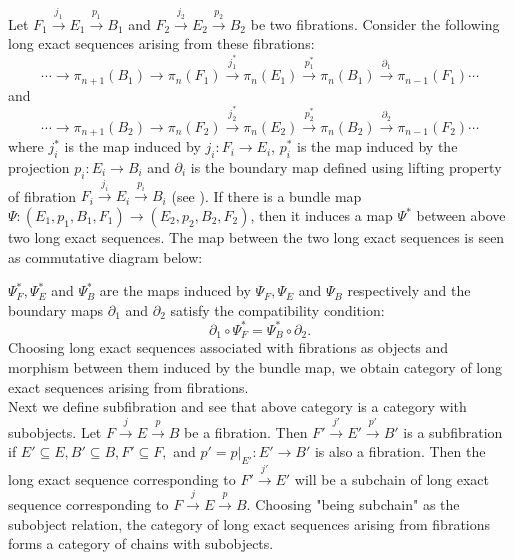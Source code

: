 \documentclass{amsart}
\theoremstyle{plain}
\begin{document}
Let $F_1\stackrel{j_1}{\rightarrow} E_1 \stackrel{p_1}{\rightarrow} B_1$ and $F_2 \stackrel{j_2}{\rightarrow} E_2 \stackrel{p_2}{\rightarrow} B_2$ be two fibrations. Consider the following long exact sequences arising from these fibrations:
$$ \cdots  \longrightarrow \pi_{n+1}(B_1)   \longrightarrow \pi_n(F_1) \stackrel{j_1^*}{\longrightarrow} \pi_n(E_1)  \stackrel{p_1^*}{\longrightarrow}\pi_n(B_1) \stackrel{\partial_1}{\longrightarrow} \pi_{n-1}(F_1) \cdots$$
and
$$\cdots  \longrightarrow \pi_{n+1}(B_2)   \longrightarrow \pi_n(F_2)  \stackrel{j_2^*}{\longrightarrow} \pi_n(E_2) \stackrel{p_2^*}{\longrightarrow} \pi_n(B_2) \stackrel{\partial_2}{\longrightarrow} \pi_{n-1}(F_2) \cdots$$
where $j_i^*$ is the map induced by $j_i: F_i \rightarrow E_i$, $p_i^*$ is the map induced by the projection $p_i: E_i \rightarrow B_i$ and $\partial_i$ is the boundary map defined using lifting property of fibration  $F_i \stackrel{j_i}{\rightarrow} E_i \stackrel{p_i}{\rightarrow} B_i$ (see \cite{Allen}).
If there is a bundle map $\Psi:  (E_1,p_1,B_1,F_1) \rightarrow (E_2,p_2,B_2,F_2) $, then it induces a map $\Psi ^*$ between above two long exact sequences. The map between the two long exact sequences is seen as commutative diagram below: \\
\begin{center}
\end{center}
$\Psi_F^*, \Psi_E^* $ and $\Psi_B^*$ are the maps induced by $\Psi_F, \Psi_E $ and $\Psi_B$ respectively and the boundary maps $\partial_1$ and $\partial_2$ satisfy the compatibility condition: 
$$ \partial_1 \circ \Psi_F^* = \Psi_B^* \circ \partial_2.$$
Choosing long exact sequences associated with fibrations as objects and morphism between them induced by the bundle map, we obtain category of long exact sequences arising from fibrations.\\
Next we define subfibration and see that above category is a category with subobjects.  
Let $F\stackrel{j}{\rightarrow} E \stackrel{p}{\rightarrow} B$ be a fibration. Then $F'\stackrel{j'}{\rightarrow} E' \stackrel{p'}{\rightarrow} B'$ is a subfibration if $E' \subseteq E, B' \subseteq B, F' \subseteq F, $ and $ p' = p|_{E'}: E' \rightarrow B'$ is also a fibration. Then the long exact sequence corresponding to $F'\stackrel{j'}{\rightarrow} E'$ will be a subchain of long exact sequence corresponding to $F\stackrel{j}{\rightarrow} E \stackrel{p}{\rightarrow} B$. Choosing "being subchain" as the subobject relation, the category of long exact sequences arising from fibrations forms a category of chains with subobjects.
\end{document}

